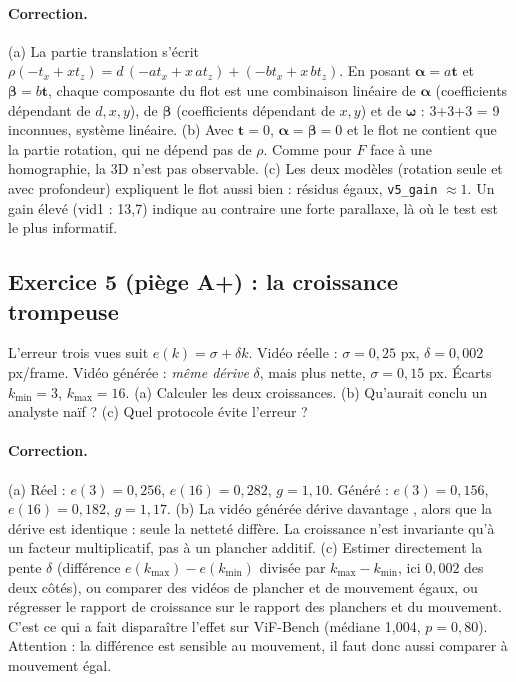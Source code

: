 \documentclass[11pt,a4paper]{article}
\begin{document}
\paragraph{Correction.}
(a) La partie translation s'écrit $\rho(-t_x+x t_z)=d\,(-at_x+x\,at_z)+(-bt_x+x\,bt_z)$. En posant
$\boldsymbol\alpha=a\mathbf t$ et $\boldsymbol\beta=b\mathbf t$, chaque composante du flot est une
combinaison linéaire de $\boldsymbol\alpha$ (coefficients dépendant de $d,x,y$), de $\boldsymbol\beta$
(coefficients dépendant de $x,y$) et de $\boldsymbol\omega$ : 3+3+3 = 9 inconnues, système linéaire.
(b) Avec $\mathbf t=0$, $\boldsymbol\alpha=\boldsymbol\beta=0$ et le flot ne contient que la partie
rotation, qui ne dépend pas de $\rho$. Comme pour $F$ face à une homographie, la 3D n'est pas observable.
(c) Les deux modèles (rotation seule et avec profondeur) expliquent le flot aussi bien : résidus
égaux, \texttt{v5\_gain} $\approx1$. Un gain élevé (vid1 : 13,7) indique au contraire une forte
parallaxe, là où le test est le plus informatif.

\subsection*{Exercice 5 (piège A+) : la croissance trompeuse}
L'erreur trois vues suit $e(k)=\sigma+\delta k$. Vidéo réelle : $\sigma=0{,}25$ px,
$\delta=0{,}002$ px/frame. Vidéo générée : \emph{même dérive} $\delta$, mais plus nette,
$\sigma=0{,}15$ px. Écarts $k_{\min}=3$, $k_{\max}=16$. (a) Calculer les deux croissances.
(b) Qu'aurait conclu un analyste naïf ? (c) Quel protocole évite l'erreur ?

\paragraph{Correction.}
(a) Réel : $e(3)=0{,}256$, $e(16)=0{,}282$, $g=1{,}10$. Généré : $e(3)=0{,}156$, $e(16)=0{,}182$,
$g=1{,}17$.
(b) \og La vidéo générée dérive davantage \fg, alors que la dérive est identique : seule la netteté
diffère. La croissance n'est invariante qu'à un facteur multiplicatif, pas à un plancher additif.
(c) Estimer directement la pente $\delta$ (différence $e(k_{\max})-e(k_{\min})$ divisée par
$k_{\max}-k_{\min}$, ici $0{,}002$ des deux côtés), ou comparer des vidéos de plancher et de mouvement
égaux, ou régresser le rapport de croissance sur le rapport des planchers et du mouvement. C'est ce qui
a fait disparaître l'effet sur ViF-Bench (médiane 1,004, $p=0{,}80$). Attention : la différence est
sensible au mouvement, il faut donc aussi comparer à mouvement égal.
\end{document}
